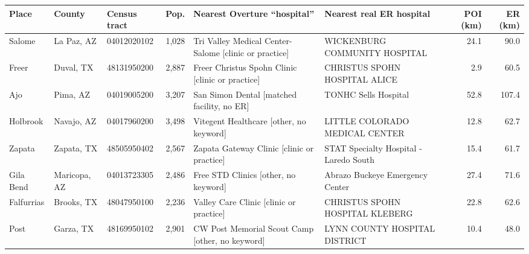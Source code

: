 {\footnotesize
\begin{tabular}{@{}p{1.9cm}p{2.4cm}p{2.2cm}rp{4.6cm}p{3.4cm}rr@{}}
\toprule
Place & County & Census tract & Pop. & Nearest Overture ``hospital'' & Nearest real ER hospital & POI (km) & ER (km) \\
\midrule
Salome & La Paz, AZ & 04012020102 & 1,028 & Tri Valley Medical Center-Salome [clinic or practice] & WICKENBURG COMMUNITY HOSPITAL & 24.1 & 90.0 \\
Freer & Duval, TX & 48131950200 & 2,887 & Freer Christus Spohn Clinic [clinic or practice] & CHRISTUS SPOHN HOSPITAL ALICE & 2.9 & 60.5 \\
Ajo & Pima, AZ & 04019005200 & 3,207 & San Simon Dental [matched facility, no ER] & TONHC Sells Hospital  & 52.8 & 107.4 \\
Holbrook & Navajo, AZ & 04017960200 & 3,498 & Vitegent Healthcare [other, no keyword] & LITTLE COLORADO MEDICAL CENTER & 12.8 & 62.7 \\
Zapata & Zapata, TX & 48505950402 & 2,567 & Zapata Gateway Clinic [clinic or practice] & STAT Specialty Hospital - Laredo South & 15.4 & 61.7 \\
Gila Bend & Maricopa, AZ & 04013723305 & 2,486 & Free STD Clinics [other, no keyword] & Abrazo Buckeye Emergency Center & 27.4 & 71.6 \\
Falfurrias & Brooks, TX & 48047950100 & 2,236 & Valley Care Clinic [clinic or practice] & CHRISTUS SPOHN HOSPITAL KLEBERG & 22.8 & 62.6 \\
Post & Garza, TX & 48169950102 & 2,901 & CW Post Memorial Scout Camp [other, no keyword] & LYNN COUNTY HOSPITAL DISTRICT & 10.4 & 48.0 \\
\bottomrule

\end{tabular}}

